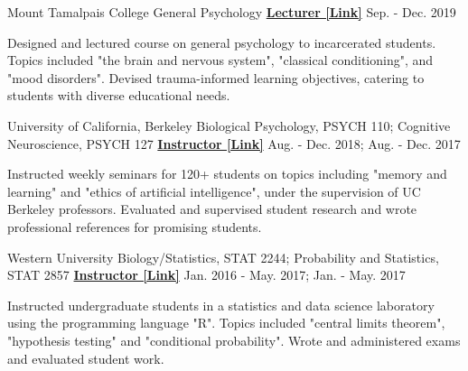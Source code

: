 

\begin{cventries}


  \cventry
    {Mount Tamalpais College} %
    {General Psychology} %
    {\href{https://docs.google.com/document/d/1CCjwp7zmqr76HUuSvEF3AMZFzeTBhddgNd5zSgZBDeA/edit?usp=sharing}{\textbf{Lecturer [Link]}}} %
    {Sep. - Dec. 2019} %
    {
      \begin{cvitems} %
        \item {Designed and lectured course on general psychology to incarcerated students. Topics included "the brain and nervous system", "classical conditioning", and "mood disorders". Devised trauma-informed learning objectives, catering to students with diverse educational needs.}  
      \end{cvitems}
    }
    
  \cventry
	{University of California, Berkeley} %
	{Biological Psychology, PSYCH 110; Cognitive Neuroscience, PSYCH 127} %
    {\href{https://docs.google.com/document/d/1rZl_JGgukSODwxE-vGzaTSg-20NvZqk4/edit?usp=sharing&ouid=110847987931723045299&rtpof=true&sd=true}{\textbf{Instructor [Link]}}} %
    {Aug. - Dec. 2018; Aug. - Dec. 2017} %
    {
      \begin{cvitems} %
        \item {Instructed weekly seminars for 120+ students on topics including "memory and learning" and "ethics of artificial intelligence", under the supervision of UC Berkeley professors. Evaluated and supervised student research and wrote professional references for promising students.}
      \end{cvitems}
    }
    
  \cventry
	{Western University} %
	{Biology/Statistics, STAT 2244; Probability and Statistics, STAT 2857} %
    {\href{https://drive.google.com/file/d/1vOkiycHtsmuYfOwiYWny_tI0iOJ-Km9m/view?usp=sharing}{\textbf{Instructor [Link]}}} %
    {Jan. 2016 - May. 2017; Jan. - May. 2017} %
    {
      \begin{cvitems} %
        \item {Instructed undergraduate students in a statistics and data science laboratory using the programming language "R". Topics included "central limits theorem", "hypothesis testing" and "conditional probability". Wrote and administered exams and evaluated student work.}
      \end{cvitems}
    }
    
    
\end{cventries}
